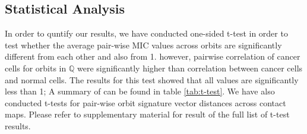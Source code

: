 \documentclass[a4,center,fleqn]{NAR}
\begin{document}
\subsection{Statistical Analysis}
In order to quntify our results, we have conducted one-sided
t-test in order to test whether the average pair-wise
MIC values across orbits are significantly different from 
each other and also from 1. 
however, pairwise correlation of cancer cells for
orbits in $\mathbb{Q}$ were significantly higher than
correlation between cancer cells and normal cells.
The results
for this test showed that all values are significantly less than 1;
A summary of can be found in
table \ref{tab:t-test}.
We have also conducted t-tests for 
pair-wise orbit signature vector distances across contact maps.
Please refer to supplementary material for result of the 
full list of t-test results.
\end{document}
